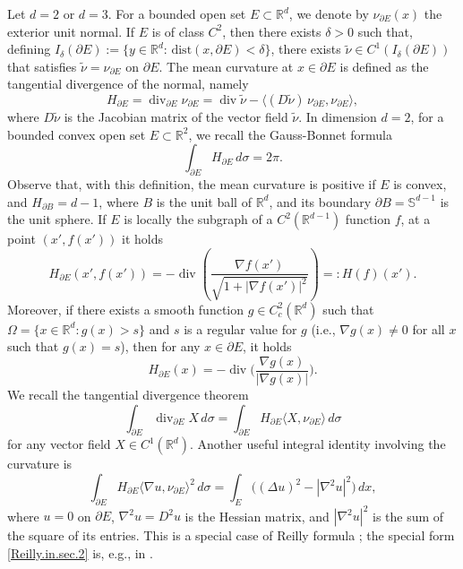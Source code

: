 \documentclass[10pt,reqno,a4paper]{article}
\numberwithin{equation}{section}
\theoremstyle{plain}
\theoremstyle{definition}
\newcommand{\R}{{\mathbb R}}
\renewcommand{\S}{{\mathbb S}}
\newcommand{\Om}{\Omega}
\newcommand{\s}{\sigma}
\newcommand{\la}{\langle}
\newcommand{\ra}{\rangle}
\newcommand{\pa}{\partial}
\renewcommand{\div}{\operatorname{div}} %
\newcommand{\grad}{\nabla}
\begin{document}
Let $d=2$ or $d=3$. For a bounded open set $E \subset \R^d$, 
we denote by $\nu_{\pa E}(x)$ the exterior unit normal. 
If $E$ is of class $C^2$, then there exists $\delta>0$ such that, 
defining $I_{\delta}(\pa E) := \{y\in \R^d: \, \mathrm{dist}(x, \pa E) < \delta\}$,
there exists $\tilde \nu \in C^1(I_\delta(\pa E))$  
that satisfies $\tilde \nu = \nu_{\pa E}$ on $\pa E$.
The mean curvature at $x \in \pa E$ is defined as the tangential divergence 
of the normal, namely 
\[
H_{\pa E} = \div_{\!\pa E} \nu_{\pa E}
= \div \tilde \nu - \la (D \tilde \nu) \,  \nu_{\pa E}, \nu_{\pa E} \ra,
\]
where %
$D \tilde \nu$ is the Jacobian matrix of the vector field $\tilde \nu$.
In dimension $d=2$, for a bounded convex open set $E \subset \R^2$, 
we recall the Gauss-Bonnet formula
\begin{equation} \label{Gauss.Bonnet}
\int_{\pa E} H_{\pa E}\,d\s = 2\pi.
\end{equation}
Observe that, with this definition, the mean curvature is positive if $E$ is convex, 
and $H_{\pa B} = d-1$, where $B$ is the unit ball of $\R^d$, 
and its boundary $\pa B = \S^{d-1}$ is the unit sphere.  
If $E$ is locally the subgraph of a $C^2(\R^{d-1})$ function $f$, at a point $(x',f(x'))$ it holds
\begin{equation}\label{eq:meancurvature.operator} 
H_{\pa E} (x',f(x'))= - \div \left( \frac{\nabla f(x')}{ \sqrt{1+|\nabla f(x')|^2}}\right)
=: H(f)(x').
\end{equation}
Moreover, if there exists a smooth function $g\in C^2_c(\R^d)$ such that 
$\Om = \{ x \in \R^d : g(x) > s \}$  
and $s$ is a regular value for $g$ (i.e., $\grad g(x) \neq 0$ for all $x$ such that $g(x) = s$),  
then for any $x\in \pa E$, it holds 
\begin{equation} \label{curvatura.level.set}
 H_{\pa E}(x) = -\div \Big( \frac{\nabla g(x)}{|\nabla g(x)|} \Big).
\end{equation}
We recall the tangential divergence theorem 
\begin{equation}\label{eq:tang.divergence}
\int_{\pa E} \div_{\pa E} X \, d\sigma
= \int_{\pa E} H_{\pa E} \la X, \nu_{\pa E} \ra \, d\sigma
\end{equation}
for any vector field $X\in C^1(\R^d)$.
Another useful integral identity involving the curvature is 
\begin{equation} \label{Reilly.in.sec.2}
\int_{\pa E} H_{\pa E} \la \grad u, \nu_{\pa E} \ra^2 \, d\sigma 
= \int_{E} \Big( (\Delta u)^2- |\nabla^2 u|^2 \Big) \, dx,
\end{equation}
where %
$u = 0$ on $\pa E$, 
$\grad^2 u = D^2 u$ is the Hessian matrix, and $|\nabla^2 u|^2$ is the sum of the square of its entries. 
This is a special case of Reilly formula \cite{Reilly.1977}; 
the special form \eqref{Reilly.in.sec.2} is, e.g., in \cite{Ros.1988}.
\end{document}
